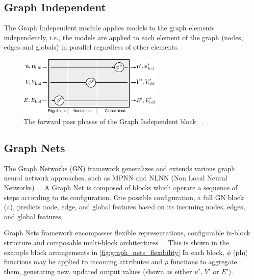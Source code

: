 \subsection{Graph Independent}

The Graph Independent module applies models to the graph elements independently, i.e., the models are applied to each element of the graph (nodes, edges and globals) in parallel regardless of other elements.

\begin{figure}[!htb]
    \centering
    \includegraphics[height=3.0cm]{fig/content/graph_nets/blocks/independent.pdf}
    \caption{The forward pass phases of the Graph Independent block ~\cite{Battaglia_2018}.}
\end{figure}

\subsection{Graph Nets}

The Graph Networks (GN) framework generalizes and extends various graph neural network approaches, such as MPNN and NLNN (Non Local Neural Networks) ~\cite{Battaglia_2018}. A Graph Net is composed of blocks which operate a sequence of steps according to its configuration. One possible configuration, a full GN block (a), predicts node, edge, and global features based on its incoming nodes, edges, and global features.

Graph Nets framework encompasses flexible representations, configurable in-block structure and composable multi-block architectures ~\cite{Battaglia_2018}. This is shown in the example block arrangements in \ref{fig:graph_nets_flexibility} In each block, $\phi$ (phi) functions may be applied to incoming attributes and $\rho$ functions to aggregate them, generating new, updated output values (shown as either $u'$, $V'$ or $E'$).

